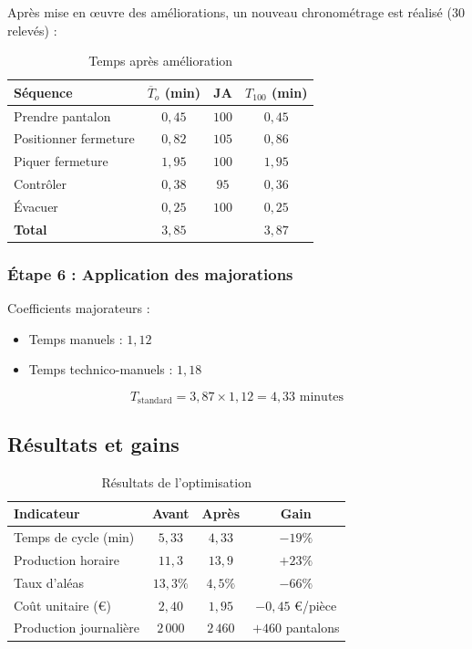\documentclass[a4paper,12pt]{article}
\begin{document}
Après mise en œuvre des améliorations, un nouveau chronométrage est réalisé ($30$ relevés) :

\begin{table}[ht]
\centering
\begin{tabular}{|l|c|c|c|}
\hline
\textbf{Séquence} & $\overline{T}_o$ (min) & \textbf{JA} & $T_{100}$ (min) \\
\hline
Prendre pantalon & $0,45$ & $100$ & $0,45$ \\
Positionner fermeture & $0,82$ & $105$ & $0,86$ \\
Piquer fermeture & $1,95$ & $100$ & $1,95$ \\
Contrôler & $0,38$ & $95$ & $0,36$ \\
Évacuer & $0,25$ & $100$ & $0,25$ \\
\hline
\textbf{Total} & $3,85$ & & $3,87$ \\
\hline
\end{tabular}
\caption{Temps après amélioration}
\end{table}

\subsubsection{Étape 6 : Application des majorations}

Coefficients majorateurs :
\begin{itemize}
    \item Temps manuels : $1,12$
    \item Temps technico-manuels : $1,18$
\end{itemize}

\[
T_{\text{standard}} = 3,87 \times 1,12 = 4,33 \text{ minutes}
\]

\subsection{Résultats et gains}

\begin{table}[ht]
\centering
\begin{tabular}{|l|c|c|c|}
\hline
\textbf{Indicateur} & \textbf{Avant} & \textbf{Après} & \textbf{Gain} \\
\hline
Temps de cycle (min) & $5,33$ & $4,33$ & $-19\%$ \\
Production horaire & $11,3$ & $13,9$ & $+23\%$ \\
Taux d'aléas & $13,3\%$ & $4,5\%$ & $-66\%$ \\
Coût unitaire (€) & $2,40$ & $1,95$ & $-0,45$ €/pièce \\
Production journalière & $2\,000$ & $2\,460$ & $+460$ pantalons \\
\hline
\end{tabular}
\caption{Résultats de l'optimisation}
\end{table}
\end{document}
